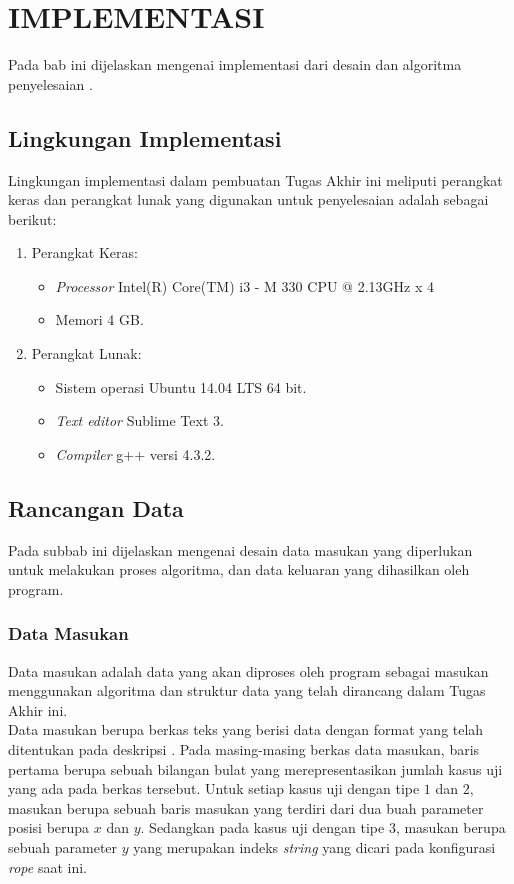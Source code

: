 \chapter{IMPLEMENTASI}
\label{chapter:implementasi}

Pada bab ini dijelaskan mengenai implementasi dari desain dan algoritma penyelesaian \problem{}.

\section{Lingkungan Implementasi}
Lingkungan implementasi dalam pembuatan Tugas Akhir ini meliputi perangkat keras dan perangkat lunak yang digunakan untuk penyelesaian \problem{} adalah sebagai berikut:

\begin{enumerate}
	\item Perangkat Keras:
		\begin{itemize}
			\item \textit{Processor} Intel(R) Core(TM) i3 - M 330 CPU @ 2.13GHz x 4 \item Memori 4 GB.
		\end{itemize}
	\item Perangkat Lunak:
	\begin{itemize}
		\item Sistem operasi Ubuntu 14.04 LTS 64 bit.
		\item \textit{Text editor} Sublime Text 3.
		\item \textit{Compiler} g++ versi 4.3.2.
	\end{itemize}			
\end{enumerate}


\section{Rancangan Data}
Pada subbab ini dijelaskan mengenai desain data masukan yang diperlukan untuk melakukan proses algoritma, dan data keluaran yang dihasilkan oleh program.

\subsection{Data Masukan}
Data masukan adalah data yang akan diproses oleh program sebagai masukan menggunakan algoritma dan struktur data yang telah dirancang dalam Tugas Akhir ini.\\
Data masukan berupa berkas teks yang berisi data dengan format yang telah ditentukan pada deskripsi \problem{}. Pada masing-masing berkas data masukan, baris pertama berupa sebuah bilangan bulat yang merepresentasikan jumlah kasus uji yang ada pada berkas tersebut. Untuk setiap kasus uji dengan tipe $1$ dan $2$, masukan berupa sebuah baris masukan yang terdiri dari dua buah parameter posisi berupa $x$ dan $y$. Sedangkan pada kasus uji dengan tipe $3$, masukan berupa sebuah parameter $y$ yang merupakan indeks \textit{string} yang dicari pada konfigurasi \textit{rope} saat ini.

